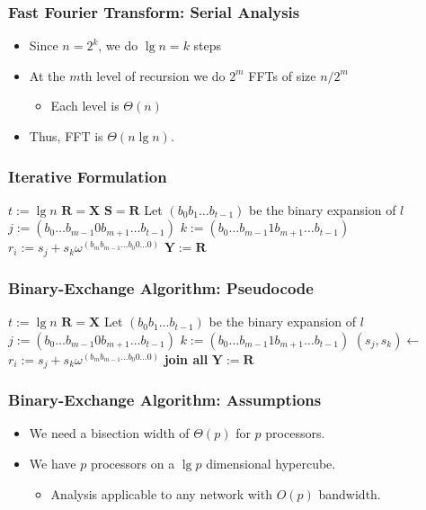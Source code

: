 \documentclass[xcolor=pdftex,dvipsnames,table]{presentation}
\begin{document}
\begin{frame}
	\frametitle{Fast Fourier Transform: Serial Analysis}

	\begin{itemize}
		\item Since $n=2^k$, we do $\lg n=k$ steps
		\item At the $m$th level of recursion we do $2^m$ FFTs of size $n/2^m$
		\begin{itemize}
			\item Each level is $\Theta(n)$
		\end{itemize}
		\item Thus, FFT is $\Theta(n\lg n)$.
	\end{itemize}
\end{frame}

\begin{frame}
	\frametitle{Iterative Formulation}
	\begin{algorithmic}[1]
			\State $t:=\lg n$
			\State $\mathbf{R}=\mathbf{X}$
				\State $\mathbf{S}=\mathbf{R}$
					\State Let $(b_0b_1\ldots b_{t-1})$ be the binary expansion of $l$
					\State $j:=(b_0\ldots b_{m-1}0b_{m+1}\ldots b_{t-1})$
					\State $k:=(b_0\ldots b_{m-1}1b_{m+1}\ldots b_{t-1})$
					\State $r_i:= s_j+s_k\omega^{(b_mb_{m-1}\ldots b_0 0\ldots0)}$
				\EndFor
			\EndFor
			\State $\mathbf{Y}:=\mathbf{R}$
		\EndFunction
	\end{algorithmic}
\end{frame}

\begin{frame}
	\frametitle{Binary-Exchange Algorithm: Pseudocode}

	\begin{algorithmic}[1]
			\State $t:=\lg n$
			\State $\mathbf{R}=\mathbf{X}$
					\State Let $(b_0b_1\ldots b_{t-1})$ be the binary expansion of $l$
					\State $j:=(b_0\ldots b_{m-1}0b_{m+1}\ldots b_{t-1})$
					\State $k:=(b_0\ldots b_{m-1}1b_{m+1}\ldots b_{t-1})$
					\State $(s_j,s_k)\gets$
					\State $r_i:= s_j+s_k\omega^{(b_mb_{m-1}\ldots b_0 0\ldots0)}$
				\EndFor
			\EndSpawn
			\State \textbf{join all}
			\State $\mathbf{Y}:=\mathbf{R}$
		\EndFunction
	\end{algorithmic}
\end{frame}

\begin{frame}
	\frametitle{Binary-Exchange Algorithm: Assumptions}

	\begin{itemize}
		\item We need a bisection width of $\Theta(p)$ for $p$ processors.
		\item We have $p$ processors on a $\lg p$ dimensional hypercube.
		\begin{itemize}
			\item Analysis applicable to any network with $O(p)$ bandwidth.
		\end{itemize}
	\end{itemize}
\end{frame}
\end{document}
